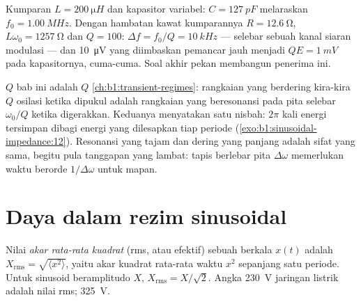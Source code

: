 \begin{example}\label{ex:b1:sinusoidal-impedance:radio}
Kumparan $L = \qty{200}{\micro H}$ dan kapasitor variabel: $C =
\qty{127}{pF}$ melaraskan $f_0 = \qty{1.00}{MHz}$. Dengan hambatan kawat
kumparannya $R = \qty{12.6}{\ohm}$, $L\omega_0 = \qty{1257}{\ohm}$ dan
$Q = 100$:  $\Delta f = f_0/Q = \qty{10}{kHz}$ --- selebar
sebuah kanal siaran modulasi  --- dan \qty{10}{\micro V} yang diimbaskan pemancar
jauh menjadi $QE = \qty{1}{mV}$ pada kapasitornya, cuma-cuma. Soal akhir
pekan membangun penerima ini.
\end{example}

\begin{remark}\label{rem:b1:sinusoidal-impedance:Q}
$Q$ bab ini adalah $Q$ \cref{ch:b1:transient-regimes}: rangkaian yang
berdering kira-kira $Q$ osilasi ketika dipukul adalah rangkaian yang
beresonansi pada pita selebar $\omega_0/Q$ ketika digerakkan. Keduanya
menyatakan satu nisbah: $2\pi$ kali energi tersimpan dibagi energi yang
dilesapkan tiap periode (\cref{exo:b1:sinusoidal-impedance:12}).
Resonansi yang tajam dan dering yang panjang adalah sifat yang sama,
begitu pula tanggapan yang lambat: tapis berlebar pita $\Delta\omega$
memerlukan waktu berorde $1/\Delta\omega$ untuk mapan.
\end{remark}

\section{Daya dalam rezim sinusoidal}

\begin{definition}\label{def:b1:sinusoidal-impedance:rms}
Nilai \emph{akar rata-rata kuadrat} (rms, atau efektif) sebuah 
berkala $x(t)$ adalah $X_{\mathrm{rms}} = \sqrt{\langle x^2\rangle}$,
yaitu akar kuadrat rata-rata waktu $x^2$ sepanjang satu periode. Untuk
sinusoid beramplitudo $X$, $X_{\mathrm{rms}} = X/\sqrt2$. Angka
\qty{230}{V} jaringan listrik adalah nilai rms;  \qty{325}{V}.
\end{definition}

